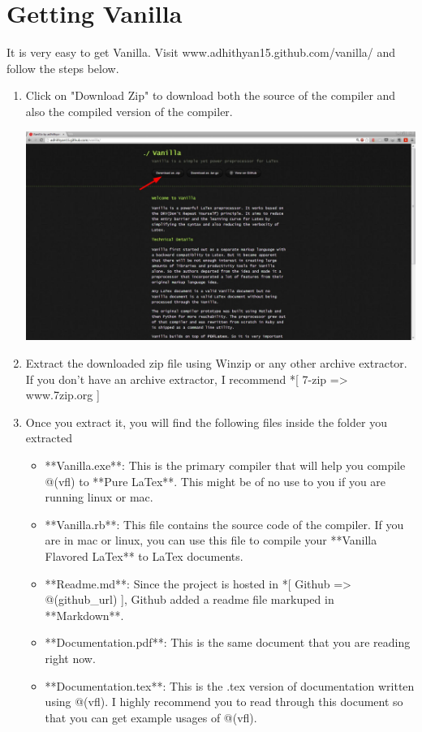 \documentclass{article}
\begin{document}
\section*{Getting Vanilla}

It is very easy to get Vanilla. Visit www.adhithyan15.github.com/vanilla/ and follow the steps below. 

\begin{enumerate}

\item Click on "Download Zip" to download both the source of the compiler and also the compiled version of the compiler. \vspace{5pt}

\includegraphics[scale=0.35]{VanillaGithub}

\item Extract the downloaded zip file using Winzip or any other archive extractor. If you don't have an archive extractor, I recommend *[ 7-zip => www.7zip.org ]

\item Once you extract it, you will find the following files inside the folder you extracted

\begin{itemize}

\item **Vanilla.exe**: This is the primary compiler that will help you compile @(vfl) to **Pure LaTex**. This might be of no use to you if you are running linux or mac. 
\item **Vanilla.rb**: This file contains the source code of the compiler. If you are in mac or linux, you can use this file to compile your **Vanilla Flavored LaTex** to LaTex documents.
\item **Readme.md**: Since the project is hosted in *[ Github => @(github_url) ], Github added a readme file markuped in **Markdown**.
\item **Documentation.pdf**: This is the same document that you are reading right now. 
\item **Documentation.tex**: This is the .tex version of documentation written using @(vfl). I highly recommend you to read through this document so that you can get example usages of @(vfl). 


\end{itemize}
\end{enumerate}
\end{document}
